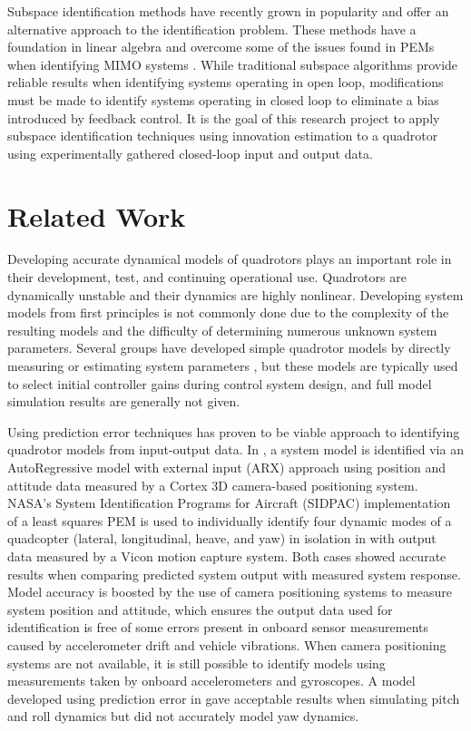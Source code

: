 Subspace identification methods have recently grown in popularity and offer an alternative approach to the identification problem. These methods have a foundation in linear algebra and overcome some of the issues found in PEMs when identifying MIMO systems \cite{katayama2005subspace}. While traditional subspace algorithms provide reliable results when identifying systems operating in open loop, modifications must be made to identify systems operating in closed loop to eliminate a bias introduced by feedback control. It is the goal of this research project to apply subspace identification techniques using innovation estimation to a quadrotor using experimentally gathered closed-loop input and output data.


\section{Related Work}
Developing accurate dynamical models of quadrotors plays an important role in their development, test, and continuing operational use. Quadrotors are dynamically unstable and their dynamics are highly nonlinear. Developing system models from first principles is not commonly done due to the complexity of the resulting models and the difficulty of determining numerous unknown system parameters. Several groups have developed simple quadrotor models by directly measuring or estimating system parameters \cite{bresciani2008modelling, domingues2009quadrotor, kivrak2006design, pounds2006modelling, schreier2012modeling}, but these models are typically used to select initial controller gains during control system design, and full model simulation results are generally not given. 

Using prediction error techniques has proven to be viable approach to identifying quadrotor models from input-output data. In \cite{chamberlain2011system}, a system model is identified via an AutoRegressive model with external input (ARX) approach using position and attitude data measured by a Cortex 3D camera-based positioning system. NASA's System Identification Programs for Aircraft (SIDPAC) implementation of a least squares PEM is used to individually identify four dynamic modes of a quadcopter (lateral, longitudinal, heave, and yaw) in isolation in \cite{miller2011open} with output data measured by a Vicon motion capture system. Both cases showed accurate results when comparing predicted system output with measured system response. Model accuracy is boosted by the use of camera positioning systems to measure system position and attitude, which ensures the output data used for identification is free of some errors present in onboard sensor measurements caused by accelerometer drift and vehicle vibrations. When camera positioning systems are not available, it is still possible to identify models using measurements taken by onboard accelerometers and gyroscopes.  A model developed using prediction error in \cite{lee2011attitude} gave acceptable results when simulating pitch and roll dynamics but did not accurately model yaw dynamics.

